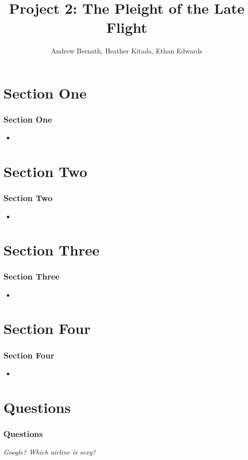 \documentclass{beamer}
\title{Project 2: The Pleight of the Late Flight}
\author{Andrew Bernath, Heather Kitada, Ethan Edwards}
\institute{Oregon State University}
\begin{document}
\begin{frame}
\titlepage
\end{frame}

\begin{frame}{\contentsname}
\begin{multicols}{2}
\tableofcontents
\end{multicols}
\end{frame}

\section{Section One}
\begin{frame}
\frametitle{Section One}
\begin{itemize}
\item 
\end{itemize}

\end{frame}

\section{Section Two}
\begin{frame}
\frametitle{Section Two}
\begin{itemize}
\item 
\end{itemize}

\end{frame}

\section{Section Three}
\begin{frame}
\frametitle{Section Three}
\begin{itemize}
\item 
\end{itemize}

\end{frame}

\section{Section Four}
\begin{frame}
\frametitle{Section Four}
\begin{itemize}
\item 
\end{itemize}

\end{frame}

\section{Questions}
\begin{frame}
\frametitle{Questions}
\begin{center}
\emph{Google? Which airline is sexy?}
\end{center}
\end{frame}

 
\end{document}
